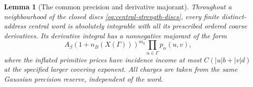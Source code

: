 \documentclass[11pt,reqno]{amsart}
\numberwithin{equation}{section}
\newtheorem{lemma}[theorem]{Lemma}
\theoremstyle{definition}
\theoremstyle{remark}
\begin{document}
\begin{lemma}[The common precision and derivative majorant]
\label{lem:central-common-reserve}
Throughout a neighbourhood of the closed discs
\eqref{eq:central-strength-discs}, every finite distinct-address
central word is absolutely integrable with all its prescribed
ordered coarse derivatives. Its derivative integral has a
nonnegative majorant of the form
\begin{equation}
 A_\beta(1+n_B(X(\Gamma)))^{m_q}
                               \prod_{\alpha\in\Gamma}p_\alpha(u,v),
 \label{eq:central-word-derivative-price}
\end{equation}
where the inflated primitive prices have incidence income at
most \(C(|u|b+|v|d)\) at the specified larger covering
exponent. All charges are taken from the same Gaussian
precision reserve, independent of the word.
\end{lemma}
\end{document}
